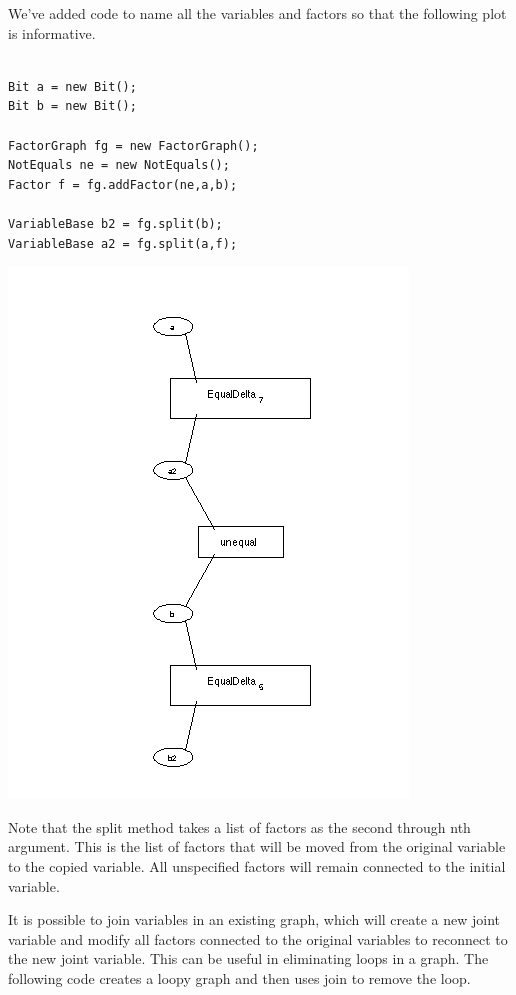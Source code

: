 We've added code to name all the variables and factors so that the following plot is informative.

\fi

\ifjava
\begin{lstlisting}

Bit a = new Bit();
Bit b = new Bit();
 
FactorGraph fg = new FactorGraph();
NotEquals ne = new NotEquals();
Factor f = fg.addFactor(ne,a,b);
		   
VariableBase b2 = fg.split(b);
VariableBase a2 = fg.split(a,f);
\end{lstlisting}

\fi

\includegraphics[width=.75\textwidth]{images/SplitGraph.png}
 
Note that the split method takes a list of factors as the second through nth argument. This is the list of factors that will be moved from the original variable to the copied variable. All unspecified factors will remain connected to the initial variable.



It is possible to join variables in an existing graph, which will create a new joint variable and modify all factors connected to the original variables to reconnect to the new joint variable. This can be useful in eliminating loops in a graph. The following code creates a loopy graph and then uses join to remove the loop.

